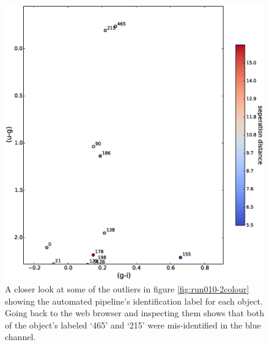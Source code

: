 \begin{figure}
\centering
\includegraphics[width=120mm]{images/colour-colour-zoom-with-labels.eps}
\caption{A closer look at some of the outliers in figure \ref{fig:run010-2colour} showing the automated pipeline's identification label for each object. Going back to the web browser and inspecting them shows that both of the object's labeled `465' and `215' were mis-identified in the blue channel. }
\label{fig:run010-2colour-zoom}
\end{figure}

